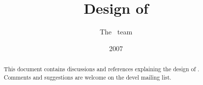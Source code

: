 \documentclass[a4paper,11pt]{article}
\title{Design of \sofa}
\author{The \sofa~team}
\date{2007}
\begin{document}
 
\maketitle

\begin{abstract}
This document contains discussions and references explaining the design of \sofa.
Comments and suggestions are welcome on the \sofa devel mailing list.
\end{abstract}


\end{document}

